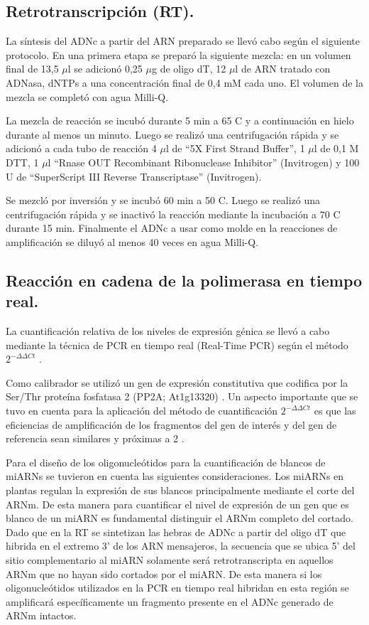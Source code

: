 \subsection{Retrotranscripción (RT).}
La síntesis del ADNc a partir del ARN preparado se llevó cabo según el siguiente protocolo.
En una primera etapa se preparó la siguiente mezcla: en un volumen final de 13,5 $\mu$l se adicionó 0,25 $\mu$g de oligo dT, 12 $\mu$l de ARN tratado con ADNasa, dNTPs a una concentración final de 0,4 mM cada uno.
El volumen de la mezcla se completó con agua Milli-Q.

La mezcla de reacción se incubó durante 5 min a 65 \degree C y a continuación en hielo durante al menos un minuto.
Luego se realizó una centrifugación rápida y se adicionó a cada tubo de reacción 4 $\mu$l de ``5X First Strand Buffer'', 1 $\mu$l de 0,1 M DTT, 1 $\mu$l “Rnase OUT Recombinant Ribonuclease Inhibitor” (Invitrogen) y 100 U de “SuperScript III Reverse Transcriptase” (Invitrogen).

Se mezcló por inversión y se incubó 60 min a 50 \degree C. Luego se realizó una centrifugación rápida y se inactivó la reacción mediante la incubación a 70 \degree C durante 15 min.
Finalmente el ADNc a usar como molde en la reacciones de amplificación se diluyó al menos 40 veces en agua Milli-Q.

\subsection{Reacción en cadena de la polimerasa en tiempo real.}
La cuantificación relativa de los niveles de expresión génica se llevó a cabo mediante la técnica de PCR en tiempo real (Real-Time PCR) según el método $2^{-\Delta \Delta Ct}$ \citep{pmid11328886}.

Como calibrador se utilizó un gen de expresión constitutiva que codifica por la Ser/Thr proteína fosfatasa 2 (PP2A; At1g13320) \citep{pmid16166256}.
Un aspecto importante que se tuvo en cuenta para la aplicación del método de cuantificación $2^{- \Delta \Delta Ct}$ es que las eficiencias de amplificación de los fragmentos del gen de interés y del gen de referencia sean similares y próximas a 2 \citep{pmid11328886}.

Para el diseño de los oligonucleótidos para la cuantificación de blancos de miARNs se tuvieron en cuenta las siguientes consideraciones. 
Los miARNs en plantas regulan la expresión de sus blancos principalmente mediante el corte del ARNm. 
De esta manera para cuantificar el nivel de expresión de un gen que es blanco de un miARN es fundamental distinguir el ARNm completo del cortado.
Dado que en la RT se sintetizan las hebras de ADNc a partir del oligo dT que hibrida en el extremo 3' de los ARN mensajeros, la secuencia que se ubica 5' del sitio complementario al miARN solamente será retrotranscripta en aquellos ARNm que no hayan sido cortados por el miARN. 
De esta manera si los oligonucleótidos utilizados en la PCR en tiempo real hibridan en esta región se amplificará específicamente un fragmento presente en el ADNc generado de ARNm intactos.

